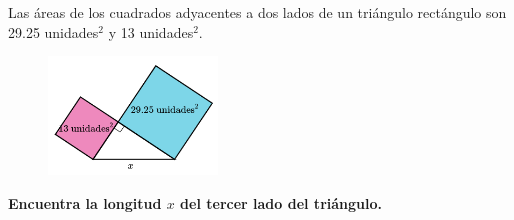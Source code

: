 Las áreas de los cuadrados adyacentes a dos lados de un triángulo rectángulo son 29.25 unidades$^2$ y 13 unidades$^2$.
\begin{figure}[H]
    \begin{center}
        \includegraphics[width=0.4\textwidth]{../images/area3.png}
    \end{center}
    \caption{}
    \label{fig:area3}
\end{figure}
\textbf{Encuentra la longitud $x$ del tercer lado del triángulo.}